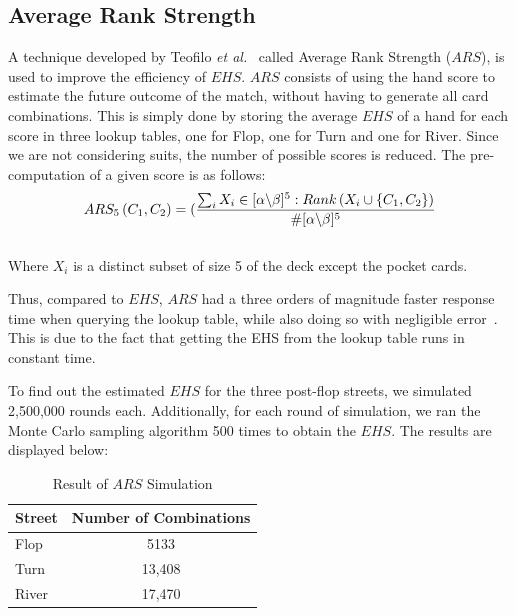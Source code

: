 \documentclass{article}
\begin{document}
\subsection{Average Rank Strength}

A technique developed by Teofilo \textit{et al.}~ called Average Rank Strength ($ARS$), is used to improve the efficiency of $EHS$. $ARS$ consists of using the hand score to estimate the future outcome of the match, without having to generate all card combinations. This is simply done by storing the average $EHS$ of a hand for each score in three lookup tables, one for Flop, one for Turn and one for River. Since we are not considering suits, the number of possible scores is reduced. The pre-computation of a given score is as follows:
\begin{displaymath}
  ARS_{5}\left(C_{1}, C_{2}\right)=(\frac{\sum_{i}X_{i} \in [\alpha \char`\\ \beta]^{5}:Rank \left(X_{i} \cup \left \lbrace C_{1}, C_{2} \right \rbrace \right)}{\#[\alpha \char`\\ \beta]^{5}}
\end{displaymath}\\
Where $X_i$ is a distinct subset of size 5 of the deck except the pocket cards.

Thus, compared to $EHS$, $ARS$ had a three orders of magnitude faster response time when querying the lookup table, while also doing so with negligible error~\cite{trc:ars}. This is due to the fact that getting the EHS from the lookup table runs in constant time.

To find out the estimated $EHS$ for the three post-flop streets, we simulated 2,500,000 rounds each. Additionally, for each round of simulation, we ran the Monte Carlo sampling algorithm 500 times to obtain the $EHS$. The results are displayed below:

\begin{table}[h!]
  \begin{center}
    \begin{tabular}{l|c}
      \textbf{Street} & \textbf{Number of Combinations} \\
      \hline
      Flop & 5133 \\
      Turn & 13,408 \\
      River & 17,470 \\
    \end{tabular}
    \caption{Result of $ARS$ Simulation}
    \label{tab:table2}
  \end{center}
\end{table}
\end{document}

